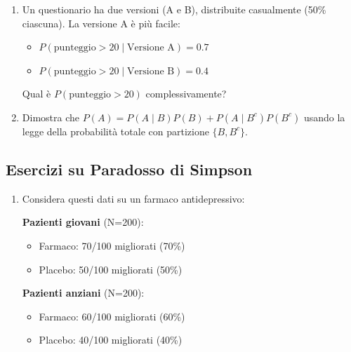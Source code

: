 \documentclass[
  letterpaper,
  DIV=11,
  numbers=noendperiod,
  oneside]{scrreprt}
\providecommand{\tightlist}{%
  \setlength{\itemsep}{0pt}\setlength{\parskip}{0pt}}
\theoremstyle{definition}
\theoremstyle{plain}
\theoremstyle{definition}
\theoremstyle{remark}
\begin{document}
\begin{tcolorbox}
\begin{enumerate}
  \begin{itemize}
  \tightlist
  \item
    60\% da medico di base (prevalenza depressione = 10\%)
  \item
    40\% da pronto soccorso (prevalenza depressione = 30\%)
  \end{itemize}

  Qual è la prevalenza complessiva nella clinica?
\item
  Un questionario ha due versioni (A e B), distribuite casualmente (50\%
  ciascuna). La versione A è più facile:

  \begin{itemize}
  \tightlist
  \item
    \(P(\text{punteggio} > 20 \mid \text{Versione A}) = 0.7\)
  \item
    \(P(\text{punteggio} > 20 \mid \text{Versione B}) = 0.4\)
  \end{itemize}

  Qual è \(P(\text{punteggio} > 20)\) complessivamente?
\item
  Dimostra che \(P(A) = P(A \mid B) P(B) + P(A \mid B^c) P(B^c)\) usando
  la legge della probabilità totale con partizione \(\{B, B^c\}\).
\end{enumerate}

\subsection{Esercizi su Paradosso di
Simpson}\label{esercizi-su-paradosso-di-simpson}

\begin{enumerate}
\def\labelenumi{\arabic{enumi}.}
\setcounter{enumi}{17}
\item
  Considera questi dati su un farmaco antidepressivo:

  \textbf{Pazienti giovani} (N=200):

  \begin{itemize}
  \tightlist
  \item
    Farmaco: 70/100 migliorati (70\%)
  \item
    Placebo: 50/100 migliorati (50\%)
  \end{itemize}

  \textbf{Pazienti anziani} (N=200):

  \begin{itemize}
  \tightlist
  \item
    Farmaco: 60/100 migliorati (60\%)
  \item
    Placebo: 40/100 migliorati (40\%)
  \end{itemize}


\end{enumerate}
\end{tcolorbox}
\end{document}
